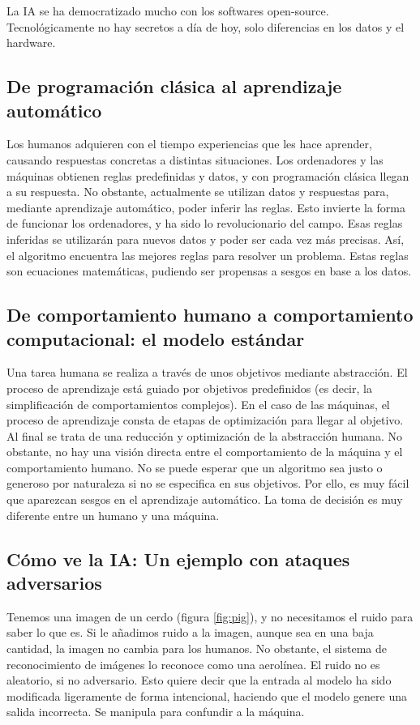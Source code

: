 La IA se ha democratizado mucho con los softwares open-source. Tecnológicamente no hay secretos a día de hoy, solo diferencias en los datos y el hardware. 

\subsection{De programación clásica al aprendizaje automático}
Los humanos adquieren con el tiempo experiencias que les hace aprender, causando respuestas concretas a distintas situaciones. Los ordenadores y las máquinas obtienen reglas predefinidas y datos, y con programación clásica llegan a su respuesta. No obstante, actualmente se utilizan datos y respuestas para, mediante aprendizaje automático, poder inferir las reglas. Esto invierte la forma de funcionar los ordenadores, y ha sido lo revolucionario del campo. Esas reglas inferidas se utilizarán para nuevos datos y poder ser cada vez más precisas. Así, el algoritmo encuentra las mejores reglas para resolver un problema. Estas reglas son ecuaciones matemáticas, pudiendo ser propensas a sesgos en base a los datos.

\subsection{De comportamiento humano a comportamiento computacional: el modelo estándar}
Una tarea humana se realiza a través de unos objetivos mediante abstracción. El proceso de aprendizaje está guiado por objetivos predefinidos (es decir, la simplificación de comportamientos complejos). En el caso de las máquinas,  el proceso de aprendizaje consta de etapas de optimización para llegar al objetivo. Al final se trata de una reducción y optimización de la abstracción humana. No obstante, no hay una visión directa entre el comportamiento de la máquina y el comportamiento humano. No se puede esperar que un algoritmo sea justo o generoso por naturaleza si no se especifica en sus objetivos. Por ello, es muy fácil que aparezcan sesgos en el aprendizaje automático. La toma de decisión es muy diferente entre un humano y una máquina.

\subsection{Cómo ve la IA: Un ejemplo con ataques adversarios}
Tenemos una imagen de un cerdo (figura \ref{fig:pig}), y no necesitamos el ruido para saber lo que es. Si le añadimos ruido a la imagen, aunque sea en una baja cantidad, la imagen no cambia para los humanos. No obstante, el sistema de reconocimiento de imágenes lo reconoce como una aerolínea. El ruido no es aleatorio, si no adversario. Esto quiere decir que la entrada al modelo ha sido modificada ligeramente de forma intencional, haciendo que el modelo genere una salida incorrecta. Se manipula para confundir a la máquina.

